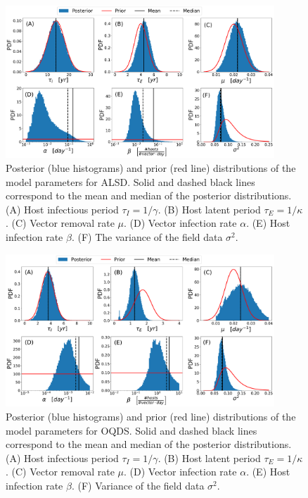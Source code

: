\begin{figure}[H]
    \centering
    \includegraphics[width=0.9\textwidth]{Figures/Parameter_estimates_ALSD.pdf}
    \caption[Posterior and prior distributions of the model parameters for
        ALSD]{Posterior (blue histograms) and prior (red line) distributions
        of the model parameters for ALSD. Solid and dashed black lines
        correspond to
        the mean and median of the posterior distributions. (A) Host infectious
        period
        $\tau_I=1/\gamma$. (B) Host latent period $\tau_E=1/\kappa$.  (C)
        Vector
        removal rate $\mu$. (D) Vector infection rate $\alpha$. (E) Host
        infection rate
        $\beta$. (F) The variance of the field data $\sigma^2$.}
    \label{fig:parameter_estimates_ALSD}
\end{figure}

\begin{figure}[H]
    \centering
    \includegraphics[width=0.9\textwidth]{Figures/Parameter_estimates_OQDS.pdf}
    \caption[Posterior and prior distributions of the model parameters for
        OQDS]{Posterior (blue histograms) and prior (red line) distributions
        of the model parameters for OQDS. Solid and dashed black lines
        correspond to
        the mean and median of the posterior distributions. (A) Host infectious
        period
        $\tau_I=1/\gamma$. (B) Host latent period $\tau_E=1/\kappa$. (C) Vector
        removal
        rate $\mu$. (D) Vector infection rate $\alpha$. (E) Host infection rate
        $\beta$. (F) Variance of the field data $\sigma^2$.}
    \label{fig:parameter_estimates_OQDS}
\end{figure}

